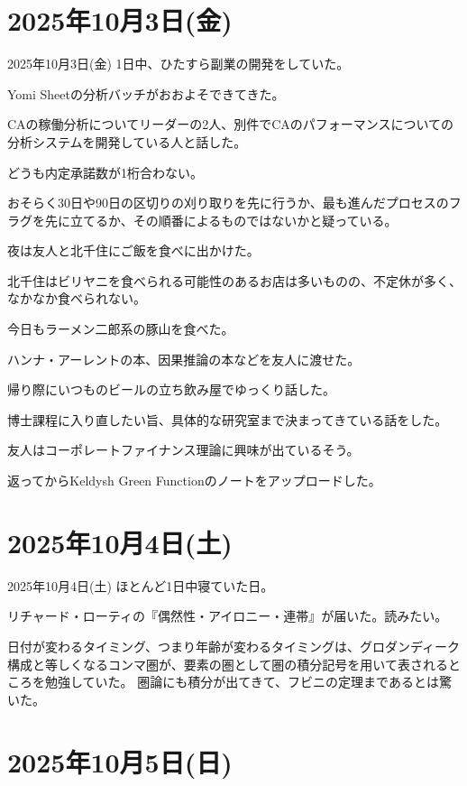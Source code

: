 \documentclass[dvipdfmx, autodetect-engine, aspectratio=169, 10.5pt]{beamer}
\begin{document}
\section{2025年10月3日(金)}

\begin{frame}{2025年10月3日(金)}
1日中、ひたすら副業の開発をしていた。

Yomi Sheetの分析バッチがおおよそできてきた。

CAの稼働分析についてリーダーの2人、別件でCAのパフォーマンスについての分析システムを開発している人と話した。

どうも内定承諾数が1桁合わない。

おそらく30日や90日の区切りの刈り取りを先に行うか、最も進んだプロセスのフラグを先に立てるか、その順番によるものではないかと疑っている。

夜は友人と北千住にご飯を食べに出かけた。

北千住はビリヤニを食べられる可能性のあるお店は多いものの、不定休が多く、なかなか食べられない。

今日もラーメン二郎系の豚山を食べた。

ハンナ・アーレントの本、因果推論の本などを友人に渡せた。

帰り際にいつものビールの立ち飲み屋でゆっくり話した。

博士課程に入り直したい旨、具体的な研究室まで決まってきている話をした。

友人はコーポレートファイナンス理論に興味が出ているそう。

返ってからKeldysh Green Functionのノートをアップロードした。
\end{frame}

\section{2025年10月4日(土)}

\begin{frame}{2025年10月4日(土)}
ほとんど1日中寝ていた日。

リチャード・ローティの『偶然性・アイロニー・連帯』が届いた。読みたい。

日付が変わるタイミング、つまり年齢が変わるタイミングは、グロダンディーク構成と等しくなるコンマ圏が、要素の圏として圏の積分記号を用いて表されるところを勉強していた。
圏論にも積分が出てきて、フビニの定理まであるとは驚いた。
\end{frame}

\section{2025年10月5日(日)}
\end{document}

